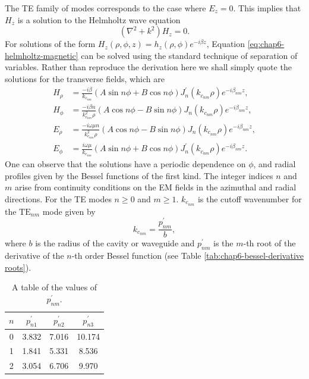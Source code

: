 The TE family of modes corresponds to the case where $E_z=0$. This implies that $H_z$ is a solution to the Helmholtz wave equation 
\begin{equation}
    (\nabla^2 + k^2)H_z = 0.
    \label{eq:chap6-helmholtz-magnetic}
\end{equation}
For solutions of the form $H_z(\rho,\phi,z)=h_z(\rho,\phi)e^{-i\beta z}$, Equation \ref{eq:chap6-helmholtz-magnetic} can be solved using the standard technique of separation of variables. Rather than reproduce the derivation here we shall simply quote the solutions for the transverse fields, which are 
\begin{align}
    H_\rho &= \frac{-i\beta }{k_{c_{nm}}}(A\sin{n\phi}+B\cos{n\phi})J_n^\prime(k_{c_{nm}}\rho)e^{-i\beta_{nm} z},\\
    H_\phi &=\frac{-i\beta n}{k_{c_{nm}}^2\rho}(A\cos{n\phi}-B\sin{n\phi})J_n(k_{c_{nm}}\rho)e^{-i\beta_{nm} z},\\
    E_\rho &=\frac{-i\omega\mu n}{k_{c_{nm}}^2 \rho}(A\cos{n\phi}-B\sin{n\phi})J_n(k_{c_{nm}}\rho)e^{-i\beta_{nm} z},\label{eq:chap6-erho-TE}\\
    E_\phi &=\frac{i\omega\mu}{k_{c_{nm}}}(A\sin{n\phi}+B\cos{n\phi})J_n^\prime(k_{c_{nm}}\rho)e^{-i\beta_{nm} z}\label{eq:chap6-ephi-TE}.
\end{align}
One can observe that the solutions have a periodic dependence on $\phi$, and radial profiles given by the Bessel functions of the first kind. The integer indices $n$ and $m$ arise from continuity conditions on the EM fields in the azimuthal and radial directions. For the TE modes $n\geq0$ and $m\geq1$. $k_{c_{nm}}$ is the cutoff wavenumber for the $\mathrm{TE}_{nm}$ mode given by 
\begin{equation}
    k_{c_{nm}} = \frac{p^\prime_{nm}}{b},
\end{equation}
where $b$ is the radius of the cavity or waveguide and $p^\prime_{nm}$ is the $m$-th root of the derivative of the $n$-th order Bessel function (see Table \ref{tab:chap6-bessel-derivative roots}).

\begin{table}[htbp]
    \centering
    \caption{\label{tab:chap6-bessel-derivative-roots} A table of the values of $p_{nm}^\prime$.}
    \begin{tabular}{c c c c }
        \hline
        $n$ & $p_{n1}^\prime$ & $p_{n2}^\prime$ & $p_{n3}^\prime$ \\
        \hline
        0 & 3.832 & 7.016 & 10.174\\
        1 & 1.841 & 5.331 & 8.536\\
        2 & 3.054 & 6.706 & 9.970\\
        \hline
    \end{tabular}
\end{table}


